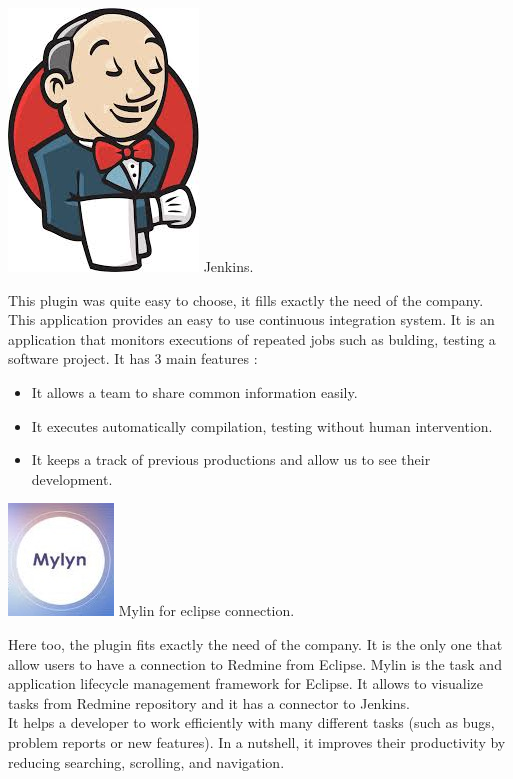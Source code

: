 

		\includegraphics[scale=0.1]{Images/jenkins.jpeg} 
		Jenkins.

		This plugin was quite easy to choose, it fills exactly the need of the 
		company. 
		This application provides an easy to use continuous integration system. 
		It is an application that monitors executions of repeated jobs such as bulding, testing a software project.
		It has 3 main features : 
		\begin{itemize}
			\item It allows a team to share common information easily.
			\item It executes automatically compilation, testing without human intervention.
			\item It keeps a track of previous productions and allow us to see their development. 
		\end{itemize}


		\includegraphics[scale=0.2]{Images/mylin.jpeg} 
		Mylin for eclipse connection. 

		Here too, the plugin fits exactly the need of the company. It is the only
		one that allow users to have a connection to Redmine from Eclipse.
		Mylin is the task and application lifecycle management framework for Eclipse.
		It allows to visualize tasks from Redmine repository and it has a 
		connector to Jenkins. \\ 
		It helps a developer to work efficiently with many different tasks 
		(such as bugs, problem reports or new features). In a nutshell, 
		it improves their productivity by reducing searching, scrolling, and 
		navigation. \\

